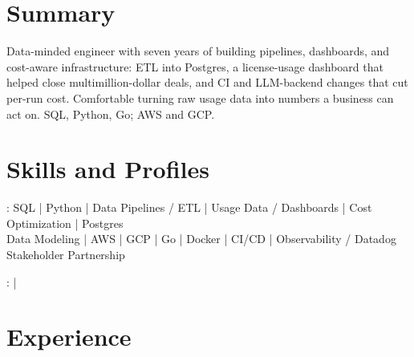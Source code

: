 \documentclass[print]{jack-resume}
\begin{document}
\pagecolor{darkmodeBackground}


\begin{minipage}[t][1cm][t]{.03\textwidth}
    \hfill
\end{minipage}

\section{Summary}
Data-minded engineer with seven years of building pipelines, dashboards, and cost-aware infrastructure: ETL into Postgres, a license-usage dashboard that helped close multimillion-dollar deals, and CI and LLM-backend changes that cut per-run cost. Comfortable turning raw usage data into numbers a business can act on. SQL, Python, Go; AWS and GCP.
\sectionsep

\section{Skills and Profiles}
:
SQL \hfill | \hfill
Python \hfill | \hfill
Data Pipelines / ETL \hfill | \hfill
Usage Data / Dashboards \hfill | \hfill
Cost Optimization \hfill | \hfill
Postgres \\
\hspace{1.0cm} Data Modeling \hfill | \hfill
AWS \hfill | \hfill
GCP \hfill | \hfill
Go \hfill | \hfill
Docker \hfill | \hfill
CI/CD \hfill | \hfill
Observability / Datadog \\
\hspace{1.0cm} Stakeholder Partnership \\

\raggedright{
    :
      \href{https://www.linkedin.com/in/jack-sturtevant/}{ \ExternalLink} |
     \href{https://github.com/jacksturt}{ \ExternalLink}}

\section{Experience}
\end{document}

